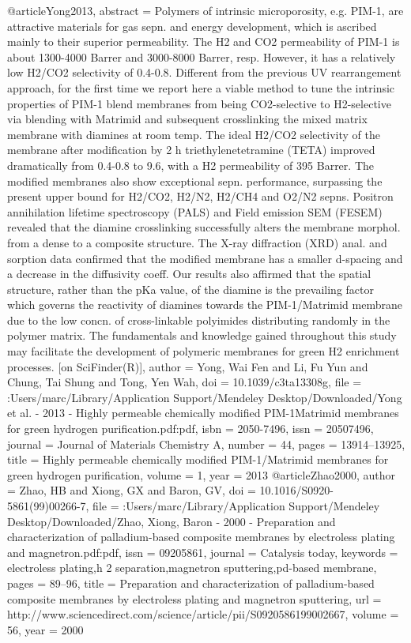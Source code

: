 @article{Yong2013,
abstract = {Polymers of intrinsic microporosity, e.g. PIM-1, are attractive materials for gas sepn. and energy development, which is ascribed mainly to their superior permeability. The H2 and CO2 permeability of PIM-1 is about 1300-4000 Barrer and 3000-8000 Barrer, resp. However, it has a relatively low H2/CO2 selectivity of 0.4-0.8. Different from the previous UV rearrangement approach, for the first time we report here a viable method to tune the intrinsic properties of PIM-1 blend membranes from being CO2-selective to H2-selective via blending with Matrimid and subsequent crosslinking the mixed matrix membrane with diamines at room temp. The ideal H2/CO2 selectivity of the membrane after modification by 2 h triethylenetetramine (TETA) improved dramatically from 0.4-0.8 to 9.6, with a H2 permeability of 395 Barrer. The modified membranes also show exceptional sepn. performance, surpassing the present upper bound for H2/CO2, H2/N2, H2/CH4 and O2/N2 sepns. Positron annihilation lifetime spectroscopy (PALS) and Field emission SEM (FESEM) revealed that the diamine crosslinking successfully alters the membrane morphol. from a dense to a composite structure. The X-ray diffraction (XRD) anal. and sorption data confirmed that the modified membrane has a smaller d-spacing and a decrease in the diffusivity coeff. Our results also affirmed that the spatial structure, rather than the pKa value, of the diamine is the prevailing factor which governs the reactivity of diamines towards the PIM-1/Matrimid membrane due to the low concn. of cross-linkable polyimides distributing randomly in the polymer matrix. The fundamentals and knowledge gained throughout this study may facilitate the development of polymeric membranes for green H2 enrichment processes. [on SciFinder(R)]},
author = {Yong, Wai Fen and Li, Fu Yun and Chung, Tai Shung and Tong, Yen Wah},
doi = {10.1039/c3ta13308g},
file = {:Users/marc/Library/Application Support/Mendeley Desktop/Downloaded/Yong et al. - 2013 - Highly permeable chemically modified PIM-1Matrimid membranes for green hydrogen purification.pdf:pdf},
isbn = {2050-7496},
issn = {20507496},
journal = {Journal of Materials Chemistry A},
number = {44},
pages = {13914--13925},
title = {{Highly permeable chemically modified PIM-1/Matrimid membranes for green hydrogen purification}},
volume = {1},
year = {2013}
}
@article{Zhao2000,
author = {Zhao, HB and Xiong, GX and Baron, GV},
doi = {10.1016/S0920-5861(99)00266-7},
file = {:Users/marc/Library/Application Support/Mendeley Desktop/Downloaded/Zhao, Xiong, Baron - 2000 - Preparation and characterization of palladium-based composite membranes by electroless plating and magnetron.pdf:pdf},
issn = {09205861},
journal = {Catalysis today},
keywords = {electroless plating,h 2 separation,magnetron sputtering,pd-based membrane},
pages = {89--96},
title = {{Preparation and characterization of palladium-based composite membranes by electroless plating and magnetron sputtering}},
url = {http://www.sciencedirect.com/science/article/pii/S0920586199002667},
volume = {56},
year = {2000}
}
